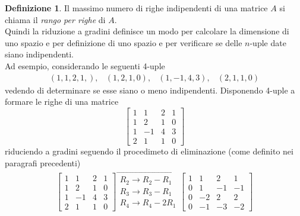 \documentclass{book}
\theoremstyle{definition}
\newtheorem{defi}{Definizione}[section]
\theoremstyle{plain}
\begin{document}
\begin{defi}
  \label{defi:gauss-jorda2}
  Il massimo numero di righe indipendenti di una matrice $A$ si
  chiama il \textit{rango per righe} di $A$.\\
  Quindi la riduzione a gradini definisce un modo per calcolare la
  dimensione di uno spazio e per definizione di uno spazio e per
  verificare se delle $n$-uple date siano indipendenti.\\
  Ad esempio, considerando le seguenti 4-uple
  \begin{equation}
    \label{eq:gauss-jorda2-1}
    \begin{matrix}
      (1,1,2,1,), & (1,2,1,0), & (1,-1,4,3), & (2,1,1,0)
    \end{matrix} 
  \end{equation}
  vedendo di determinare se esse siano o meno indipendenti. Disponendo
  4-uple a formare le righe di una matrice
  \begin{equation*}
    \begin{bmatrix}
      1 & 1 & 2 & 1\\
      1 & 2 & 1 & 0\\
      1 & -1 & 4 & 3\\
      2 & 1 & 1 & 0
    \end{bmatrix}
  \end{equation*}
  riduciendo a gradini seguendo il procedimeto di eliminazione (come
  definito nei paragrafi precedenti)
  \begin{equation}
    \label{eq:gauss-jorda2-2}
    \begin{matrix}
      \begin{bmatrix}
        1 & 1 & 2 & 1\\
        1 & 2 & 1 & 0\\
        1 & -1 & 4 & 3\\
        2 & 1 & 1 & 0
      \end{bmatrix}
      \overrightarrow{
      \begin{matrix}
        R_2\to R_2-R_1\\
        R_3\to R_3-R_1\\
        R_4\to R_4-2R_1
      \end{matrix}
      }
      \begin{bmatrix}
        1 & 1 & 2 & 1\\
        0 & 1 & -1 & -1\\
        0 & -2 & 2 & 2\\
        0 & -1 & -3 & -2
      \end{bmatrix}

\end{matrix}
\end{equation}
\end{defi}
\end{document}
